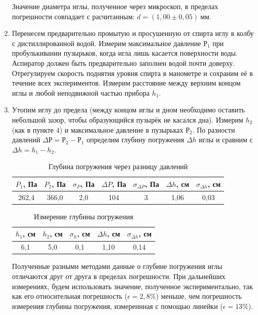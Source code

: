 \documentclass[12pt,a4paper]{article}
\begin{document}
\begin{enumerate}
    Значение диаметра иглы, полученное через микроскоп, в пределах погрешности совпадает с расчитанным: $d = (1,00 \pm 0,05)\ мм$.
    
    \item Перенесем предварительно промытую и просушенную от спирта иглу в колбу с дистиллированной водой. Измерим максимальное давление $Р_1$ при пробулькивании пузырьков, когда игла лишь касается поверхности воды. Аспиратор должен быть предварительно  заполнен водой почти доверху. Отрегулируем скорость поднятия уровня спирта в манометре и сохраним её в течение всех экспериментов. Измерим расстояние между верхним концом иглы и любой неподвижной частью прибора $h_1$.
    
    \item Утопим иглу до предела (между концом иглы и дном необходимо оставить небольшой зазор, чтобы образующийся пузырёк не касался дна). Измерим $h_2$ (как в пункте 4) и максимальное давление в пузырьках $Р_2$.
    По разности давлений $\Delta Р = Р_2 - Р_1$ определим глубину погружения $\Delta h$ иглы и сравним с $\Delta h =  h_1- h_2$.
    
    \begin{table}[ht]
        \centering
        \begin{tabular}{|c|c|c|c|c|c|c|}
            \hline
             $P_1$, Па & $P_2$, Па & $\sigma_P$, Па & $\Delta P$, Па & $\sigma_{\Delta P}$, Па & $\Delta h$, см & $\sigma_{\Delta h}$,  см \\
             \hline
             262,4& 366,0& 2,0 & 104&3 & 1,06& 0,03\\
             \hline 
        \end{tabular}
        \caption{Глубина погружения через разницу давлений}
    \end{table}
    
    \begin{table}[ht]
        \centering
        \begin{tabular}{|c|c|c|c|c|}
        \hline
            $h_1$, см & $h_2$, см & $\sigma_h$, см & $\Delta h$, см & $\sigma_{\Delta h}$, см  \\
            \hline
             6,1& 5,0 & 0,1&1,10 & 0,14\\
            \hline
        \end{tabular}
        \caption{Измерение глубины погружения}
    \end{table}

    Полученные разными методами данные о глубине погружения иглы отличаются друг от друга в пределах погрешности. При дальнейших измерениях, будем использовать значение, полученное экспериментально, так как его относительная погрешность ($\epsilon=2,8
    \%$) меньше, чем погрешность измерения глубины погружения, измереннная с помощью линейки ($\epsilon=13\%$).
    

\end{enumerate}
\end{document}

